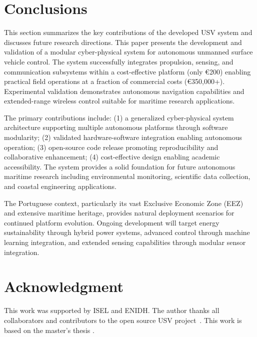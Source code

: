 \documentclass[conference]{IEEEtran}
\begin{document}
\section{Conclusions}
\label{sec:conclusions}
This section summarizes the key contributions of the developed USV system and discusses future research directions.
This paper presents the development and validation of a modular cyber-physical system for autonomous unmanned surface vehicle control. The system successfully integrates propulsion, sensing, and communication subsystems within a cost-effective platform (only €200) enabling practical field operations at a fraction of commercial costs (€350,000+). Experimental validation demonstrates autonomous navigation capabilities and extended-range wireless control suitable for maritime research applications.

The primary contributions include: (1) a generalized cyber-physical system architecture supporting multiple autonomous platforms through software modularity; (2) validated hardware-software integration enabling autonomous operation; (3) open-source code release promoting reproducibility and collaborative enhancement; (4) cost-effective design enabling academic accessibility. The system provides a solid foundation for future autonomous maritime research including environmental monitoring, scientific data collection, and coastal engineering applications.

The Portuguese context, particularly its vast Exclusive Economic Zone (EEZ) and extensive maritime heritage, provides natural deployment scenarios for continued platform evolution. Ongoing development will target energy sustainability through hybrid power systems, advanced control through machine learning integration, and extended sensing capabilities through modular sensor integration.

\section*{Acknowledgment}
This work was supported by ISEL and ENIDH. The author thanks all collaborators and contributors to the open source USV project~\cite{github-usv}. This work is based on the master's thesis \cite{usv2025}.


\end{document}
